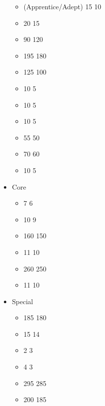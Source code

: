 \begin{itemize}
\begin{itemize}
		\item \deathculthierarch{} \hierophant{} (Apprentice/Adept) 15 \costdown{} 10
		\item \deathculthierarch{} \skeletalhorse{} 20 \costdown{} 15
		\item \deathculthierarch{} \arkofages{} 90 \costup{} 120
		\item \casketofphatep{} \basecost{} 195 \costdown{} 180
		\item \tombharbinger{} \basecost{} 125 \costdown{} 100
		\item \tombharbinger{} \ha{} 10 \costdown{} 5
		\item \tombharbinger{} \gw{} 10 \costdown{} 5
		\item \tombharbinger{} \lance{} 10 \costdown{} 5
		\item \tombharbinger{} \amuut{} 55 \costdown{} 50
		\item \tombharbinger{} \skeletonchariot{} 70 \costdown{} 60
		\item \tombarchitect{} \lance{} 10 \costdown{} 5
	\end{itemize}
	\item Core
	\begin{itemize}
		\item \skeletons{} \extramodel{} 7 \costdown{} 6
		\item \skeletonarchers{} \extramodel{} 10 \costdown{} 9
		\item \skeletoncavalrySINGULAR{} \basecost{} 160 \costdown{} 150
		\item \skeletoncavalrySINGULAR{} \extramodel{} 11 \costdown{} 10
		\item \skeletonchariots{} \basecost{} 260 \costdown{} 250
		\item \skeletonchariots{} \legioncharioteers{} 11 \costdown{} 10
	\end{itemize}
	\item Special
	\begin{itemize}
		\item \necropolisguardSINGULAR{} \basecost{} 185 \costdown{} 180
		\item \necropolisguardSINGULAR{} \extramodel{} 15 \costdown{} 14
		\item \necropolisguardSINGULAR{} \halberd{} 2 \costup{} 3
		\item \necropolisguardSINGULAR{} \pw{} 4 \costdown{} 3
		\item \tombcataphracts{} \basecost{} 295 \costdown{} 285
		\item \shabtis{} \basecost{} 200 \costdown{} 185

\end{itemize}
\end{itemize}
